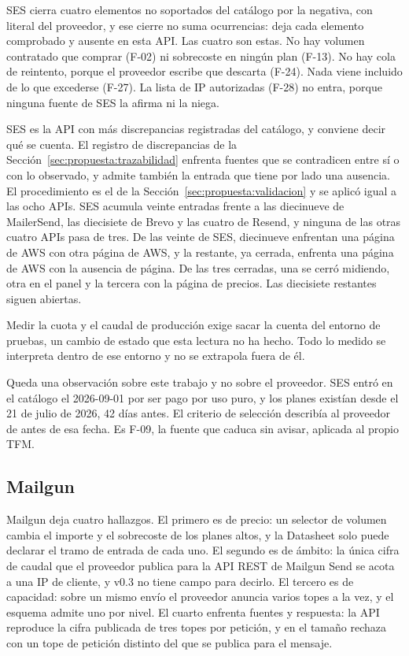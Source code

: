 SES cierra cuatro elementos no soportados del catálogo por la negativa, con literal del
proveedor, y ese cierre no suma ocurrencias: deja cada elemento comprobado y ausente en
esta API.
Las cuatro son estas. No hay volumen contratado que comprar (F-02) ni
sobrecoste en ningún plan (F-13). No hay cola de
reintento, porque el proveedor escribe que descarta (F-24). Nada viene
incluido de lo que excederse (F-27).
La lista de IP autorizadas (F-28) no entra, porque ninguna fuente de SES la afirma ni la niega.

SES es la API con más discrepancias registradas del catálogo, y conviene decir
qué se cuenta. El registro de discrepancias de la
Sección~\ref{sec:propuesta:trazabilidad} enfrenta fuentes que se contradicen
entre sí o con lo observado, y admite también la entrada que tiene por lado una
ausencia. El procedimiento es el de la
Sección~\ref{sec:propuesta:validacion} y se aplicó igual a las ocho APIs. SES
acumula veinte entradas frente a las diecinueve de MailerSend, las diecisiete
de Brevo y las cuatro de Resend, y ninguna de las otras cuatro APIs pasa de tres.
De las veinte de SES, diecinueve enfrentan una página de AWS con otra página
de AWS, y la restante, ya cerrada, enfrenta una página de AWS con la ausencia
de página. De las tres cerradas, una se cerró midiendo, otra en el panel y la tercera con la página de precios.
Las diecisiete restantes siguen abiertas.

Medir la cuota y el caudal de producción exige sacar la cuenta del entorno de
pruebas, un cambio de estado que esta lectura no ha hecho. Todo lo medido se
interpreta dentro de ese entorno y no se extrapola fuera de él.

Queda una observación sobre este trabajo y no sobre el proveedor. SES entró en
el catálogo el 2026-09-01 por ser pago por uso puro, y los planes existían
desde el 21 de julio de 2026, 42 días antes. El criterio de selección describía
al proveedor de antes de esa fecha. Es F-09, la fuente que caduca sin avisar,
aplicada al propio TFM.

\subsection{Mailgun}
\label{subsec:hallazgos:mailgun}

Mailgun \citep{mailgunpricing,mailgundocs} deja cuatro hallazgos. El primero
es de precio: un selector de volumen cambia el importe y el sobrecoste de los
planes altos, y la Datasheet solo puede declarar el tramo de entrada de cada
uno. El segundo es de ámbito: la única cifra de caudal que el proveedor publica
para la API REST de Mailgun Send se acota a una IP de cliente, y v0.3
no tiene campo para decirlo. El tercero es de capacidad: sobre un mismo envío el
proveedor anuncia varios topes a la vez, y el esquema admite uno por nivel. El
cuarto enfrenta fuentes y respuesta: la API reproduce la cifra publicada de tres
topes por petición, y en el tamaño rechaza con un tope de petición distinto del
que se publica para el mensaje.


